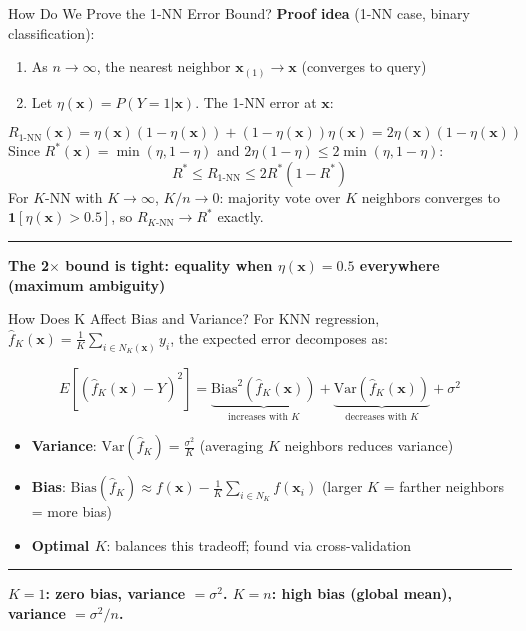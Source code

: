 \documentclass[8pt,aspectratio=169]{beamer}
\newcommand{\bottomnote}[1]{%
\vfill
\vspace{-2mm}
\textcolor{mllavender2}{\rule{\textwidth}{0.4pt}}
\vspace{1mm}
\footnotesize
\textbf{#1}
}
\begin{document}
\begin{frame}[t]{How Do We Prove the 1-NN Error Bound?}
\textbf{Proof idea} (1-NN case, binary classification):

\begin{enumerate}
\item As $n \to \infty$, the nearest neighbor $\mathbf{x}_{(1)} \to \mathbf{x}$ (converges to query)
\item Let $\eta(\mathbf{x}) = P(Y=1|\mathbf{x})$. The 1-NN error at $\mathbf{x}$:
\end{enumerate}
$$R_{1\text{-NN}}(\mathbf{x}) = \eta(\mathbf{x})(1-\eta(\mathbf{x})) + (1-\eta(\mathbf{x}))\eta(\mathbf{x}) = 2\eta(\mathbf{x})(1-\eta(\mathbf{x}))$$
\vspace{0.3em}
Since $R^*(\mathbf{x}) = \min(\eta, 1-\eta)$ and $2\eta(1-\eta) \leq 2\min(\eta,1-\eta)$:
$$R^* \leq R_{1\text{-NN}} \leq 2R^*(1 - R^*)$$
\vspace{0.3em}
For $K$-NN with $K \to \infty$, $K/n \to 0$: majority vote over $K$ neighbors converges to $\mathbf{1}[\eta(\mathbf{x}) > 0.5]$, so $R_{K\text{-NN}} \to R^*$ exactly.
\bottomnote{The 2$\times$ bound is tight: equality when $\eta(\mathbf{x}) = 0.5$ everywhere (maximum ambiguity)}
\end{frame}

\begin{frame}[t]{How Does K Affect Bias and Variance?}
For KNN regression, $\hat{f}_K(\mathbf{x}) = \frac{1}{K}\sum_{i \in N_K(\mathbf{x})} y_i$, the expected error decomposes as:

$$E[(\hat{f}_K(\mathbf{x}) - Y)^2] = \underbrace{\text{Bias}^2(\hat{f}_K(\mathbf{x}))}_{\text{increases with } K} + \underbrace{\text{Var}(\hat{f}_K(\mathbf{x}))}_{\text{decreases with } K} + \sigma^2$$

\begin{itemize}
\item \textbf{Variance}: $\text{Var}(\hat{f}_K) = \frac{\sigma^2}{K}$ \quad (averaging $K$ neighbors reduces variance)
\item \textbf{Bias}: $\text{Bias}(\hat{f}_K) \approx f(\mathbf{x}) - \frac{1}{K}\sum_{i \in N_K} f(\mathbf{x}_i)$ \quad (larger $K$ = farther neighbors = more bias)
\item \textbf{Optimal $K$}: balances this tradeoff; found via cross-validation
\end{itemize}
\bottomnote{$K=1$: zero bias, variance $= \sigma^2$. \quad $K=n$: high bias (global mean), variance $= \sigma^2/n$.}
\end{frame}
\end{document}
